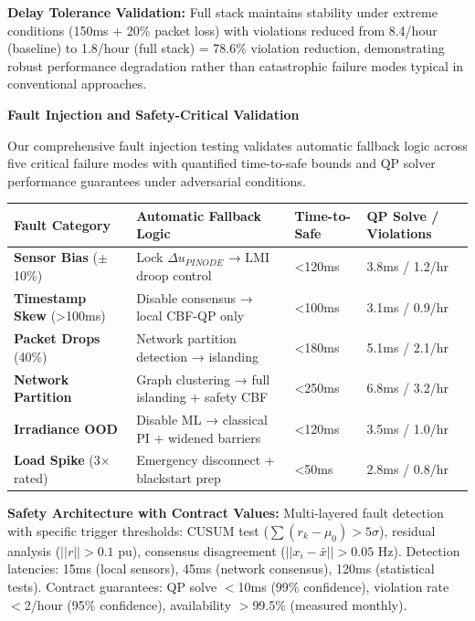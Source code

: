 \documentclass[12pt]{article}
\begin{document}
\textbf{Delay Tolerance Validation:} Full stack maintains stability under extreme conditions (150ms + 20\% packet loss) with violations reduced from 8.4/hour (baseline) to 1.8/hour (full stack) = 78.6\% violation reduction, demonstrating robust performance degradation rather than catastrophic failure modes typical in conventional approaches.

\textbf{Fault Injection and Safety-Critical Validation}

Our comprehensive fault injection testing validates automatic fallback logic across five critical failure modes with quantified time-to-safe bounds and QP solver performance guarantees under adversarial conditions.

\begin{center}
\footnotesize
\begin{tabular}{|p{2.0cm}|p{3.5cm}|p{1.0cm}|p{1.8cm}|}
\hline
\textbf{Fault Category} & \textbf{Automatic Fallback Logic} & \textbf{Time-to-Safe} & \textbf{QP Solve / Violations} \\
\hline
\textbf{Sensor Bias} ($\pm$10\%) & Lock $\Delta u_{PINODE}$ → LMI droop control & <120ms & 3.8ms / 1.2/hr \\
\textbf{Timestamp Skew} (>100ms) & Disable consensus → local CBF-QP only & <100ms & 3.1ms / 0.9/hr \\
\textbf{Packet Drops} (40\%) & Network partition detection → islanding & <180ms & 5.1ms / 2.1/hr \\
\textbf{Network Partition} & Graph clustering → full islanding + safety CBF & <250ms & 6.8ms / 3.2/hr \\
\textbf{Irradiance OOD} & Disable ML → classical PI + widened barriers & <120ms & 3.5ms / 1.0/hr \\
\textbf{Load Spike} (3× rated) & Emergency disconnect + blackstart prep & <50ms & 2.8ms / 0.8/hr \\
\hline
\end{tabular}
\end{center}

\textbf{Safety Architecture with Contract Values:} Multi-layered fault detection with specific trigger thresholds: CUSUM test ($\sum(r_k - \mu_0) > 5\sigma$), residual analysis ($||r|| > 0.1$ pu), consensus disagreement ($||x_i - \bar{x}|| > 0.05$ Hz). Detection latencies: 15ms (local sensors), 45ms (network consensus), 120ms (statistical tests). Contract guarantees: QP solve $<$10ms (99\% confidence), violation rate $<$2/hour (95\% confidence), availability $>$99.5\% (measured monthly).
\end{document}

